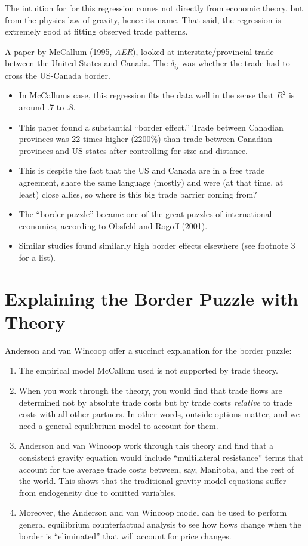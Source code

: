 \documentclass[twoside]{article}
\begin{document}
The intuition for for this regression comes not directly from economic theory, but from the physics law of gravity, hence its name. That said, the regression is extremely good at fitting observed trade patterns. 

A paper by McCallum (1995, \emph{AER}), looked at interstate/provincial trade between the United States and Canada. The $\delta_{ij}$ was whether the trade had to cross the US-Canada border. 
\begin{itemize}
\item In McCallums case, this regression fits the data well in the sense that $R^2$ is around .7 to .8. 
\item This paper found a substantial ``border effect.'' Trade between Canadian provinces was 22 times higher (2200\%) than trade between Canadian provinces and US states after controlling for size and distance. 
\item This is despite the fact that the US and Canada are in a free trade agreement, share the same language (mostly) and were (at that time, at least) close allies, so where is this big trade barrier coming from? 
\item The ``border puzzle'' became one of the great puzzles of international economics, according to Obsfeld and Rogoff (2001).
\item Similar studies found similarly high border effects elsewhere (see footnote 3 for a list). 
\end{itemize}

\section{Explaining the Border Puzzle with Theory}

Anderson and van Wincoop offer a succinct explanation for the border puzzle:
\begin{enumerate}
\item The empirical model McCallum used is not supported by trade theory. 
\item When you work through the theory, you would find that trade flows are determined not by absolute trade costs but by trade costs \emph{relative} to trade costs with all other partners. In other words, outside options matter, and we need a general equilibrium model to account for them. 
\item Anderson and van Wincoop work through this theory and find that a consistent gravity equation would include ``multilateral resistance'' terms that account for the average trade costs between, say, Manitoba, and the rest of the world. 
This shows that the traditional gravity model equations suffer from endogeneity due to omitted variables. 
\item Moreover, the Anderson and van Wincoop model can be used to perform general equilibrium counterfactual analysis to see how flows change when the border is ``eliminated'' that will account for price changes. 
\end{enumerate}
\end{document}
